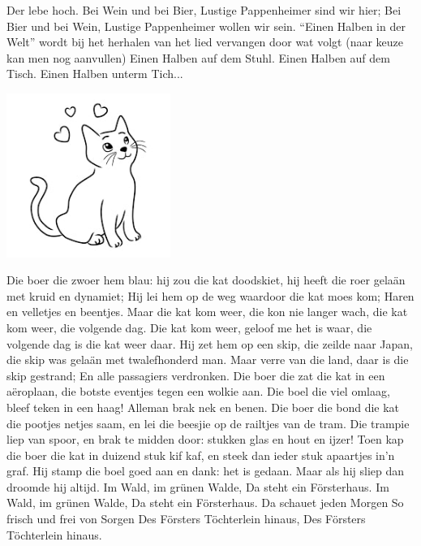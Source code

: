 \documentclass{article}
\begin{document}
\begin{songs}{}
Der lebe hoch.             
Bei Wein und bei Bier,
Lustige Pappenheimer sind wir hier;
Bei Bier und bei Wein,
Lustige Pappenheimer wollen wir sein. 
\endverse
\beginchorus
“Einen Halben in der Welt” wordt bij het herhalen van het lied vervangen door wat volgt (naar keuze kan men nog aanvullen)
\endchorus
\beginverse*
Einen Halben auf dem Stuhl.
Einen Halben auf dem Tisch. 
Einen Halben unterm Tich...
\endverse
\endsong
\begin{intersong}
    \includegraphics[width=0.4\textwidth]{diekatkomweer}
\end{intersong}
\beginverse
Die boer die zwoer hem blau: hij zou die kat doodskiet,
hij heeft die roer gelaän met kruid en dynamiet;
Hij lei hem op de weg waardoor die kat moes kom;
Haren en velletjes en beentjes.
\endverse
\beginchorus
Maar die kat kom weer, die kon nie langer wach,
die kat kom weer, die volgende dag.
Die kat kom weer, geloof me het is waar,
die volgende dag is die kat weer daar.
\endchorus
\beginverse
Hij zet hem op een skip, die zeilde naar Japan,
die skip was gelaän met twalefhonderd man.
Maar verre van die land, daar is die skip gestrand;
En alle passagiers verdronken.
\endverse
\beginverse
Die boer die zat die kat in een aëroplaan,
die botste eventjes tegen een wolkie aan.
Die boel die viel omlaag, bleef teken in een haag!
Alleman brak nek en benen.
\endverse
\beginverse
Die boer die bond die kat die pootjes netjes saam,
en lei die beesjie op de railtjes van de tram.
Die trampie liep van spoor, en brak te midden door:
stukken glas en hout en ijzer!
\endverse
\beginverse
Toen kap die boer die kat in duizend stuk kif kaf, 
en steek dan ieder stuk apaartjes in’n graf.
Hij stamp die boel goed aan en dank: het is gedaan.
Maar als hij sliep dan droomde hij altijd. 
\endverse
\endsong
{}
\beginverse
Im Wald, im grünen Walde,
Da steht ein Försterhaus.
Im Wald, im grünen Walde,
Da steht ein Försterhaus.
Da schauet jeden Morgen
So frisch und frei von Sorgen
Des Försters Töchterlein hinaus,
Des Försters Töchterlein hinaus.

\end{songs}
\end{document}
